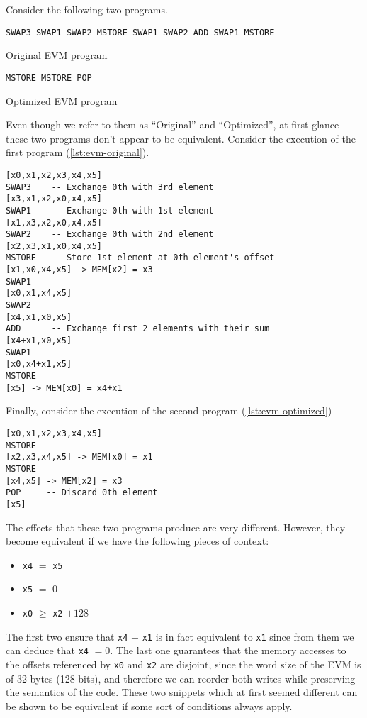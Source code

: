 
Consider the following two programs.

\begin{listing}[!ht]
\begin{verbatim}
SWAP3 SWAP1 SWAP2 MSTORE SWAP1 SWAP2 ADD SWAP1 MSTORE
\end{verbatim}
\caption{Original EVM program}
\label{lst:evm-original}
\end{listing}

\begin{listing}[!ht]
\begin{verbatim}
MSTORE MSTORE POP 
\end{verbatim}
\caption{Optimized EVM program}
\label{lst:evm-optimized}
\end{listing}

Even though we refer to them as ``Original'' and ``Optimized'', at first glance these two programs don't
appear to be equivalent. Consider the execution of the first program (\ref{lst:evm-original}).

\begin{verbatim}
[x0,x1,x2,x3,x4,x5]
SWAP3    -- Exchange 0th with 3rd element
[x3,x1,x2,x0,x4,x5]
SWAP1    -- Exchange 0th with 1st element
[x1,x3,x2,x0,x4,x5]
SWAP2    -- Exchange 0th with 2nd element
[x2,x3,x1,x0,x4,x5]
MSTORE   -- Store 1st element at 0th element's offset
[x1,x0,x4,x5] -> MEM[x2] = x3
SWAP1
[x0,x1,x4,x5]
SWAP2
[x4,x1,x0,x5]
ADD      -- Exchange first 2 elements with their sum
[x4+x1,x0,x5]
SWAP1
[x0,x4+x1,x5]
MSTORE
[x5] -> MEM[x0] = x4+x1
\end{verbatim}

Finally, consider the execution of the second program (\ref{lst:evm-optimized})

\begin{verbatim}
[x0,x1,x2,x3,x4,x5]
MSTORE
[x2,x3,x4,x5] -> MEM[x0] = x1
MSTORE
[x4,x5] -> MEM[x2] = x3
POP     -- Discard 0th element
[x5] 
\end{verbatim}

The effects that these two programs produce are very different. However, they become equivalent
if we have the following pieces of context:

\begin{itemize}
    \item \verb|x4| $=$ \verb|x5|
    \item \verb|x5| $=$ 0
    \item \verb|x0| $\ge$ \verb|x2| $+ 128$
\end{itemize}

The first two ensure that \verb|x4| $+$ \verb|x1| is in fact equivalent to \verb|x1| since from them we
can deduce that \verb|x4| $= 0$. The last one guarantees that the memory accesses to the offsets
referenced by \verb|x0| and \verb|x2| are disjoint, since the word size of the EVM is of 32 bytes (128 
bits), and therefore we can reorder both writes while preserving the semantics of the code. These two
snippets which at first seemed different can be shown to be equivalent if some sort of conditions always
apply.